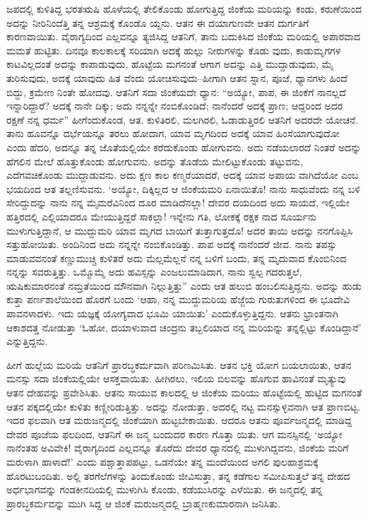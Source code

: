 ಜಪದಲ್ಲಿ ಕುಳಿತಿದ್ದ ಭರತಋಷಿ ಹೊಳೆಯಲ್ಲಿ ತೇಲಿಕೊಂಡು ಹೋಗುತ್ತಿದ್ದ ಜಿಂಕೆಯ ಮರಿಯನ್ನು ಕಂಡು, ಕರುಣೆಯಿಂದ ಅದನ್ನು ನೀರಿನಿಂದೆತ್ತಿ ತನ್ನ ಆಶ್ರಮಕ್ಕೆ ಕೊಂಡೊ ಯ್ದನು. ಆತನ ಈ ದಯಾಗುಣವೇ ಆತನ ದುರ್ಗತಿಗೆ ಕಾರಣವಾಯಿತು. ವೈರಾಗ್ಯದಿಂದ ಎಲ್ಲವನ್ನೂ ತ್ಯಜಿಸಿದ್ದ ಆತನಿಗೆ, ತಾನು ಬದುಕಿಸಿದ ಜಿಂಕೆಯ ಮರಿಯಲ್ಲಿ ಅಪಾರವಾದ ಮಮತೆ ಹುಟ್ಟಿತು. ದಿನವೂ ಕಾಲಕಾಲಕ್ಕೆ ಸರಿಯಾಗಿ ಅದಕ್ಕೆ ಹುಲ್ಲು ನೀರುಗಳನ್ನು ಕೊಡು ವುದು, ಕಾಡುಮೃಗಗಳ ಕಾಟವಿಲ್ಲದಂತೆ ಅದನ್ನು ಕಾಪಾಡುವುದು, ಹೊಟ್ಟೆಯ ಮಗನಂತೆ ಆಗಾಗ ಅದನ್ನು ಎತ್ತಿ ಮುದ್ದಾಡುವುದು, ಮೈ ತುರಿಸುವುದು, ಅದಕ್ಕೆ ಯಾವುದು ಹಿತ ವೆಂದು ಯೋಚಿಸುವುದು–ಹೀಗಾಗಿ ಆತನ ಸ್ನಾನ, ಪೂಜೆ, ಧ್ಯಾನಗಳು ಹಿಂದೆ ಬಿದ್ದು, ಕ್ರಮೇಣ ನಿಂತೇ ಹೋದವು. ಆತನಿಗೆ ಸದಾ ಜಿಂಕೆಯದೇ ಧ್ಯಾನ: “ಅಯ್ಯೋ, ಪಾಪ, ಈ ಜಿಂಕೆಗೆ ನಾನಲ್ಲದೆ ಇನ್ನಾರಿದ್ದಾರೆ? ಅದಕ್ಕೆ ನಾನೇ ದಿಕ್ಕು; ಅದು ನನ್ನನ್ನೇ ನಂಬಿಕೊಂಡಿದೆ; ನಾನೆಂದರೆ ಅದಕ್ಕೆ ಪ್ರಾಣ; ಆದ್ದರಿಂದ ಅದರ ರಕ್ಷಣೆ ನನ್ನ ಧರ್ಮ” ಹೀಗೆಂದುಕೊಂಡ, ಆತ. ಕುಳಿತಿರಲಿ, ಮಲಗಿರಲಿ, ಓಡಾಡುತ್ತಿರಲಿ ಆತನಿಗೆ ಅದರದೇ ಯೋಚನೆ. ತಾನು ಹೂವನ್ನೊ ದರ್ಭೆಯನ್ನೂ ತರಲು ಹೋದಾಗ, ಯಾವ ಮೃಗದಿಂದ ಅದಕ್ಕೆ ಯಾವ ಹಿಂಸೆಯಾಗುವುದೋ ಎಂದು ಹೆದರಿ, ಅದನ್ನೂ ತನ್ನ ಜೊತೆಯಲ್ಲಿಯೇ ಕರೆದುಕೊಂಡು ಹೋಗುವನು. ಅದು ನಡೆಯಲಾರದೆ ನಿಂತರೆ ಅದನ್ನು ಹೆಗಲಿನ ಮೇಲೆ ಹೊತ್ತುಕೊಂಡು ಹೋಗುವನು. ಅದನ್ನು ತೊಡೆಯ ಮೇಲಿಟ್ಟುಕೊಂಡು ತಟ್ಟುವನು, ಎದೆಗವಚಿಕೊಂಡು ಮುದ್ದಾಡುವನು. ಅದು ಕ್ಷಣ ಕಾಲ ಕಣ್ಮರೆಯಾದರೆ, ಅದಕ್ಕೆ ಯಾವ ಅಪಾಯ ವಾಗಿದೆಯೋ ಎಂಬ ಭಯದಿಂದ ಆತ ತಲ್ಲಣಿಸುವನು. ‘ಅಯ್ಯೋ, ದಿಕ್ಕಿಲ್ಲದ ಆ ಜಿಂಕೆಯಮರಿ ಏನಾಯಿತೊ! ನಾನು ಸಾಧುವೆಂದು ನನ್ನ ಬಳಿ ಸೇರಿದ್ದುದನ್ನು ನಾನು ನನ್ನ ಮೈಮರೆವಿನಿಂದ ದೂರ ಮಾಡಿದೆನಲ್ಲಾ! ದೇವರ ದಯದಿಂದ ಅದು ಸಾಯದೆ, ಇಲ್ಲಿಯೇ ಹತ್ತಿರದಲ್ಲಿ ಎಲ್ಲಿಯಾದರೂ ಮೇಯುತ್ತಿದ್ದರೆ ಸಾಕಲ್ಲಾ! ಇನ್ನೇನು ಗತಿ, ಲೋಕಕ್ಕೆ ರಕ್ಷಕ ನಾದ ಸೂರ್ಯನು ಮುಳುಗುತ್ತಿದ್ದಾನೆ, ಆ ಮುದ್ದುಮರಿ ಯಾವ ಮೃಗದ ಬಾಯಿಗೆ ತುತ್ತಾಗುತ್ತದೊ! ಅದರ ತಾಯಿ ಅದನ್ನು ನನಗೊಪ್ಪಿಸಿ ಸತ್ತುಹೋಯಿತು. ಅಂದಿನಿಂದ ಅದು ನನ್ನನ್ನೇ ನಂಬಿಕೊಂಡಿತ್ತು. ಪಾಪ ಅದಕ್ಕೆ ನಾನೆಂದರೆ ಜೀವ. ನಾನು ತಪಸ್ಸು ಮಾಡುವವನಂತೆ ಕಣ್ಣುಮುಚ್ಚಿ ಕುಳಿತರೆ ಅದು ಮೆಲ್ಲಮೆಲ್ಲನೆ ನನ್ನ ಬಳಿಗೆ ಬಂದು, ತನ್ನ ಮೃದುವಾದ ಕೊಂಬಿನಿಂದ ನನ್ನನ್ನು ಸವರುತ್ತಿತ್ತು. ಒಮ್ಮೊಮ್ಮೆ ಅದು ಹವಿಸ್ಸನ್ನು ಎಂಜಲುಮಾಡಿದಾಗ, ನಾನು ಸ್ವಲ್ಪ ಗದರುತ್ತಲೆ, ಋಷಿಕುಮಾರನಂತೆ ನಮ್ರತೆಯಿಂದ ಮೌನವಾಗಿ ನಿಲ್ಲುತ್ತಿತ್ತು” ಎಂದು ಆತ ಹಲುಬಿ ಹಂಬಲಿಸುತ್ತಿದ್ದನು. ಅದನ್ನು ಹುಡು ಕುತ್ತಾ ಪರ್ಣಶಾಲೆಯಿಂದ ಹೊರಗೆ ಬಂದು ‘ಆಹಾ, ನನ್ನ ಮುದ್ದುಮರಿಯ ಹೆಜ್ಜೆಯ ಗುರುತುಗಳಿಂದ ಈ ಭೂದೇವಿ ಪಾವನಳಾದಳು. ಇದು ಯಜ್ಞಕ್ಕೆ ಯೋಗ್ಯವಾದ ಭೂಮಿ ಯಾಯಿತು’ ಎಂದುಕೊಳ್ಳುತ್ತಿದ್ದನು. ಆತನು ಭ್ರಾಂತನಾಗಿ ಆಕಾಶದತ್ತ ನೋಡುತ್ತಾ ‘ಓಹೋ, ದಯಾಳುವಾದ ಚಂದ್ರನು ತಬ್ಬಲಿಯಾದ ನನ್ನ ಮರಿಯನ್ನು ತನ್ನಲ್ಲಿಟ್ಟು ಕೊಂಡಿದ್ದಾನೆ’ ಎನ್ನುತ್ತಿದ್ದನು.

ಹೀಗೆ ಹುಲ್ಲೆಯ ಮರಿಯೆ ಆತನಿಗೆ ಪ್ರಾರಬ್ಧಕರ್ಮವಾಗಿ ಪರಿಣಮಿಸಿತು. ಆತನ ಭಕ್ತಿ ಯೋಗ ಬಯಲಾಯಿತು, ಆತನ ಮನಸ್ಸು ಸದಾ ಜಿಂಕೆಯಲ್ಲಿಯೇ ಆಸಕ್ತವಾಯಿತು. ಹೀಗಿರಲು, ಇಲಿಯ ಬಿಲವನ್ನು ಹೊಗುವ ಹಾವಿನಂತೆ ಮೃತ್ಯುವು ಆತನ ದೇಹವನ್ನು ಪ್ರವೇಶಿಸಿತು. ಆತನು ಸಾಯುವ ಕಾಲದಲ್ಲಿ ಆ ಜಿಂಕೆಯ ಮರಿಯು ಹೊಟ್ಟೆಯಲ್ಲಿ ಹುಟ್ಟಿದ ಮಗನಂತೆ ಆತನ ಪಕ್ಕದಲ್ಲಿಯೇ ಕುಳಿತು ಕಣ್ಣೀರಿಡುತ್ತಿತ್ತು. ಅದನ್ನು ನೋಡುತ್ತಾ, ಅದರಲ್ಲಿ ನಟ್ಟ ಮನಸ್ಸುಳ್ಳವನಾಗಿ ಆತ ಪ್ರಾಣಬಿಟ್ಟ. ಇದರ ಫಲವಾಗಿ ಆತ ಮರುಜನ್ಮದಲ್ಲಿ ಜಿಂಕೆಯಾಗಿ ಹುಟ್ಟಬೇಕಾಯಿತು. ಆದರೂ ಆತನು ಪೂರ್ವಜನ್ಮದಲ್ಲಿ ಮಾಡಿದ್ದ ದೇವರ ಪೂಜೆಯ ಫಲದಿಂದ, ಆತನಿಗೆ ಈ ಜನ್ಮ ಬಂದುದರ ಕಾರಣ ಗೊತ್ತಾ ಯಿತು. ಆಗ ಮನಸ್ಸಿನಲ್ಲಿ ‘ಅಯ್ಯೋ ನಾನೆಂತಹ ಅವಿವೇಕಿ! ವೈರಾಗ್ಯದಿಂದ ಎಲ್ಲವನ್ನೂ ತೊರೆದು ದೇವರ ಧ್ಯಾನದಲ್ಲಿ ಮುಳುಗಿದ್ದವನು, ಜಿಂಕೆಯ ಮರಿಗೆ ಮರುಳಾಗಿ ಹಾಳಾದೆ!’ ಎಂದು ಪಶ್ಚಾತ್ತಾಪಪಟ್ಟು, ಒಡನೆಯೇ ತನ್ನ ಮಂದೆಯಿಂದ ಅಗಲಿ ಪುಲಹಾಶ್ರಮಕ್ಕೆ ಹೊರಟುಬಂದಿತು. ಅಲ್ಲಿ ತರಗೆಲೆಗಳನ್ನು ತಿಂದುಕೊಂಡು ಜೀವಿಸುತ್ತಾ, ತನ್ನ ಕಡೆಗಾಲ ಸಮೀಪಿಸುತ್ತಲೆ ತನ್ನ ದೇಹದ ಅರ್ಧಭಾಗವನ್ನು ಗಂಡಕೀನದಿಯಲ್ಲಿ ಮುಳುಗಿಸಿ ಕೊಂಡು, ಕಡೆಯುಸಿರನ್ನು ಎಳೆಯಿತು. ಈ ಜನ್ಮದಲ್ಲಿ ತನ್ನ ಪ್ರಾರಬ್ಧಕರ್ಮವನ್ನು ಮುಗಿ ಸಿದ್ದ ಆ ಜಿಂಕೆ ಮರುಜನ್ಮದಲ್ಲಿ ಬ್ರಾಹ್ಮಣಕುಮಾರನಾಗಿ ಜನಿಸಿತು.

